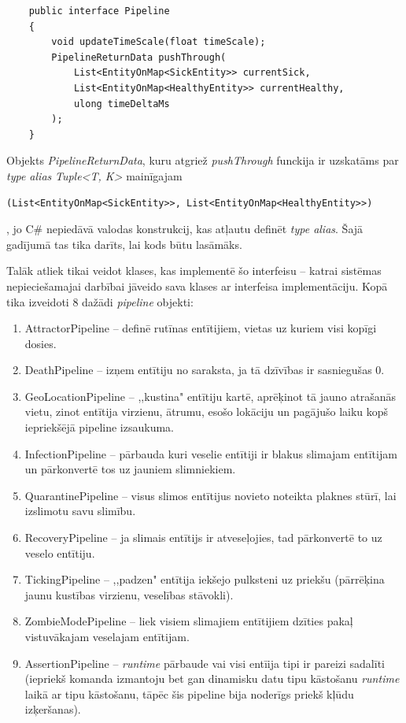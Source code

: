 {
\begin{verbatim}
    public interface Pipeline
    {
        void updateTimeScale(float timeScale);
        PipelineReturnData pushThrough(
            List<EntityOnMap<SickEntity>> currentSick,
            List<EntityOnMap<HealthyEntity>> currentHealthy,
            ulong timeDeltaMs
        );
    }
\end{verbatim}
}

Objekts \emph{PipelineReturnData}, kuru atgriež \emph{pushThrough} funckija ir
uzskatāms par \emph{type alias} \emph{Tuple<T, K>} mainīgajam

{
\begin{verbatim}
(List<EntityOnMap<SickEntity>>, List<EntityOnMap<HealthyEntity>>)
\end{verbatim}
}

, jo C\# nepiedāvā valodas konstrukcij, kas atļautu definēt
\emph{type alias}. Šajā gadījumā tas tika darīts, lai kods būtu lasāmāks.

Talāk atliek tikai veidot klases, kas implementē šo interfeisu -- katrai sistēmas
nepieciešamajai darbībai jāveido sava klases ar interfeisa implementāciju. Kopā
tika izveidoti 8 dažādi \emph{pipeline} objekti:

\begin{enumerate}
    \item AttractorPipeline -- definē rutīnas entītijiem, vietas uz kuriem visi kopīgi dosies.
    \item DeathPipeline -- izņem entītiju no saraksta, ja tā dzīvības ir sasniegušas 0.
    \item GeoLocationPipeline -- ,,kustina" entītiju kartē, aprēķinot tā jauno
        atrašanās vietu, zinot entītija virzienu, ātrumu, esošo lokāciju un pagājušo
        laiku kopš iepriekšējā pipeline izsaukuma.
    \item InfectionPipeline -- pārbauda kuri veselie entītiji ir blakus slimajam
        entītijam un pārkonvertē tos uz jauniem slimniekiem.
    \item QuarantinePipeline -- visus slimos entītijus novieto noteikta plaknes
        stūrī, lai izslimotu savu slimību.
    \item RecoveryPipeline -- ja slimais entītijs ir atveseļojies, tad pārkonvertē to uz veselo entītiju.
    \item TickingPipeline -- ,,padzen" entītija iekšejo pulksteni uz priekšu (pārrēķina jaunu kustības virzienu, veselības stāvokli).
    \item ZombieModePipeline -- liek visiem slimajiem entītijiem dzīties pakaļ vistuvākajam veselajam entītijam.
    \item AssertionPipeline -- \emph{runtime} pārbaude vai visi entīija tipi ir
        pareizi sadalīti (iepriekš komanda izmantoju bet gan dinamisku datu tipu
        kāstošanu \emph{runtime} laikā ar tipu kāstošanu, tāpēc šis pipeline bija
        noderīgs priekš kļūdu izķeršanas).
\end{enumerate}


